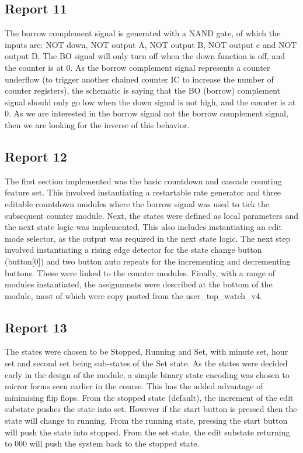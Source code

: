 \documentclass{report}
\begin{document}
\subsection{Report 11}
The borrow complement signal is generated with a NAND gate, of which the inputs are: NOT down, 
NOT output A, NOT output B, NOT output c and NOT output D. The BO signal will only
turn off when the down function is off, and the counter is at 0. As the borrow complement signal 
represents a counter underflow (to trigger another chained counter IC to increase the 
number of counter registers), the schematic is saying that the BO (borrow) complement signal should 
only go low when the down signal is not high, and the counter is at 0. As we are interested 
in the borrow signal not the borrow complement signal, then we are looking for the inverse of 
this behavior. 

\subsection{Report 12}
The first section implemented was the basic countdown and cascade counting 
feature set. This involved instantiating a restartable rate generator and 
three editable countdown modules where the borrow signal was used to tick the 
subsequent counter module. Next, the states were defined as local parameters and 
the next state logic was implemented. This also includes instantiating an edit 
mode selector, as the output was required in the next state logic.
\break
\break
The next step involved instantiating a rising edge detector for the state change 
button (button[0]) and two button auto repeats for the incrementing and 
decrementing buttons. These were linked to the counter modules.
\break
\break
Finally, with a range of modules instantiated, the assignmnets were described at 
the bottom of the module, most of which were copy pasted from the user\_top\_watch\_v4. 

\subsection{Report 13}
The states were chosen to be Stopped, Running and Set, with minute set, hour set 
and second set being sub-states of the Set state. As the states were decided early 
in the design of the module, a simple binary state encoding was chosen to mirror 
forms seen earlier in the course. This has the added advantage of minimising flip 
flops.
\break
\break
From the stopped state (default), the increment of the edit substate pushes the 
state into set. However if the start button is pressed then the state will change 
to running. From the running state, pressing the start button will push the state 
into stopped. From the set state, the edit substate returning to 000 will push the 
system back to the stopped state.
\end{document}
